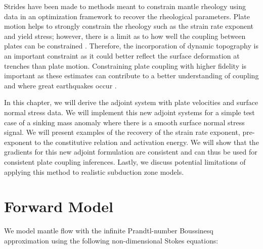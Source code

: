 \documentclass[12pt]{article}
\begin{document}
	Strides have been made to methods meant to constrain mantle rheology using data in an optimization framework \citep{Worthen2014,ratnaswamy2015adjoint} to recover the rheological parameters. 
Plate motion helps to strongly constrain the rheology such as the strain rate exponent and yield stress; however, there is a limit as to how well the coupling between plates can be constrained \citep{ratnaswamy2015adjoint}. Therefore, the incorporation of dynamic topography is an important constraint as it could better reflect the surface deformation at trenches than plate motion. Constraining plate coupling with higher fidelity is important as these estimates can contribute to a better understanding of coupling and where great earthquakes occur \citep{scholz2012seismic}.

In this chapter, we will derive the adjoint system with plate velocities and surface normal stress data. We will implement this new adjoint systems for a simple test case of a sinking mass anomaly where there is a smooth surface normal stress signal. We will present examples of the recovery of the strain rate exponent, pre-exponent to the constitutive relation and activation energy. We will show that the gradients for this new adjoint formulation are consistent and can thus be used for consistent plate coupling inferences.  Lastly, we discuss potential limitations of applying this method to realistic subduction zone models. 


\section*{Forward Model}

We model mantle flow with the infinite Prandtl-number Boussinesq
approximation using the following non-dimensional Stokes
equations:
\end{document}
